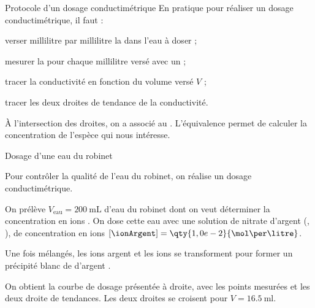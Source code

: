 \begin{doc}{Protocole d'un dosage conductimétrique}
  En pratique pour réaliser un dosage conductimétrique, il faut :
  \begin{protocole}
    \item verser millilitre par millilitre la  dans l'eau à doser ;
  \end{protocole}

  \vspace*{-18pt}
  \begin{wrapfigure}[4]{r}{0.58\linewidth}
    \hspace*{-60pt}
  \end{wrapfigure}

  \strut
  \begin{protocole}
    \item mesurer la  pour chaque millilitre versé avec un  ;
    \item tracer la conductivité en fonction du volume versé $V$ ;
    \item tracer les deux droites de tendance de la conductivité.
  \end{protocole}
  
  \vspace{4.4cm}
  \begin{importants}  
    À l'intersection des droites, on a  associé au .
    L'équivalence permet de calculer la concentration de l'espèce qui nous intéresse.
  \end{importants}
\end{doc}

\newpage
\begin{doc}{Dosage d'une eau du robinet}
  \begin{wrapfigure}{r}{0.4\linewidth}
    \vspace*{-36pt}
    \centering
  \end{wrapfigure}
  Pour contrôler la qualité de l'eau du robinet, on réalise un dosage conductimétrique.

  On prélève $V_\text{eau} = \qty{200}{\mL}$ d'eau du robinet dont on veut déterminer la concentration en ions  \chlorure.
  On dose cette eau avec une solution de nitrate d'argent (\ionArgent, \nitrate), de concentration en ions $[\ionArgent] = \qty{1,0e-2}{\mol\per\litre}$.

  Une fois mélangés, les ions argent et les ions  se transforment pour former un précipité blanc de  d'argent \chlorureDArgent.

  On obtient la courbe de dosage présentée à droite, avec les points mesurées et les deux droite de tendances.
  Les deux droites se croisent pour $V = \qty{16,5}{\ml}$.
\end{doc}

